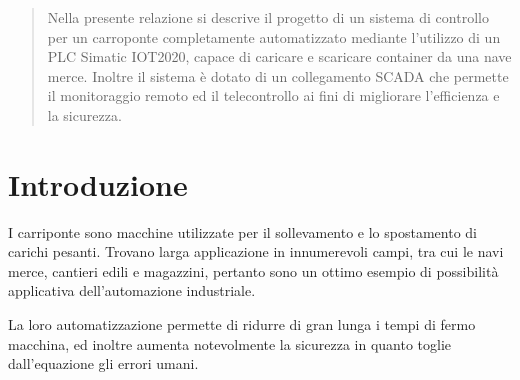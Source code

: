 

\SetupMinted{}




\begin{abstract}
    Nella presente relazione si descrive il progetto di un sistema di controllo per un carroponte
    completamente automatizzato mediante l'utilizzo di un PLC Simatic IOT2020, capace di caricare e
    scaricare container da una nave merce. Inoltre il sistema è dotato di un collegamento SCADA che
    permette il monitoraggio remoto ed il telecontrollo ai fini di migliorare l'efficienza e la
    sicurezza. \cite{arm2015real}
\end{abstract}

\section{Introduzione}

I carriponte sono macchine utilizzate per il sollevamento e lo spostamento di carichi pesanti.
Trovano larga applicazione in innumerevoli campi, tra cui le navi merce, cantieri edili e magazzini,
pertanto sono un ottimo esempio di possibilità applicativa dell'automazione industriale. \cite{ren2021design,li2015data}

La loro automatizzazione permette di ridurre di gran lunga i tempi di fermo macchina, ed inoltre
aumenta notevolmente la sicurezza in quanto toglie dall'equazione gli errori umani. \cite{gupta2004simplified}

